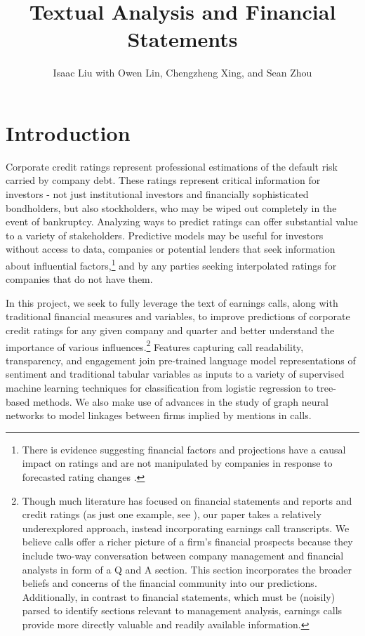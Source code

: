 \documentclass{article}[11pt]
\title{Textual Analysis and Financial Statements}
\author{Isaac Liu with Owen Lin, Chengzheng Xing, and Sean Zhou}
\begin{document}
	\maketitle

    \section*{Introduction}

    Corporate credit ratings represent professional estimations of the default risk carried by company debt. These ratings represent critical information for investors - not just institutional investors and financially sophisticated bondholders, but also stockholders, who may be wiped out completely in the event of bankruptcy. Analyzing ways to predict ratings can offer substantial value to a variety of stakeholders. Predictive models may be useful for investors without access to data, companies or potential lenders that seek information about influential factors,\footnote{There is evidence suggesting financial factors and projections have a causal impact on ratings and are not manipulated by companies in response to forecasted rating changes \citep{he_impact_2018}.} and by any parties seeking interpolated ratings for companies that do not have them.

    In this project, we seek to fully leverage the text of earnings calls, along with traditional financial measures and variables, to improve predictions of corporate credit ratings for any given company and quarter and better understand the importance of various influences.\footnote{Though much literature has focused on financial statements and reports and credit ratings (as just one example, see \cite{makwana_understanding_2022}), our paper takes a relatively underexplored approach, instead incorporating earnings call transcripts. We believe calls offer a richer picture of a firm's financial prospects because they include two-way conversation between company management and financial analysts in form of a Q and A section. This section incorporates the broader beliefs and concerns of the financial community into our predictions. Additionally, in contrast to financial statements, which must be (noisily) parsed to identify sections relevant to management analysis, earnings calls provide more directly valuable and readily available information.} Features capturing call readability, transparency, and engagement join pre-trained language model representations of sentiment \citep{araci_finbert_2019} and traditional tabular variables as inputs to a variety of supervised machine learning techniques for classification from logistic regression to tree-based methods. We also make use of advances in the study of graph neural networks to model linkages between firms implied by mentions in calls. \citep{das_credit_2023}
\end{document}
